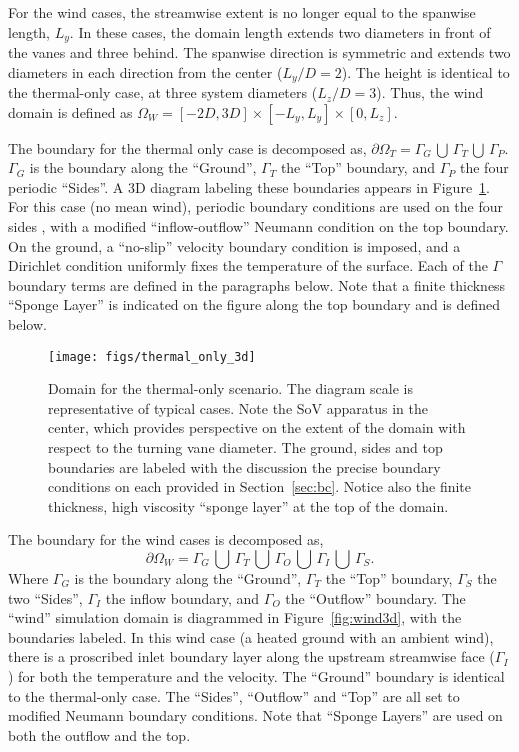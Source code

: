 For the wind cases, the streamwise extent is no longer equal to
the spanwise length, $L_y$. In these cases, the domain length extends
two diameters in front of the vanes and three behind. The
spanwise direction is symmetric and extends two diameters in each direction 
from the center ($L_y/D = 2$). The height is identical to the
thermal-only case, at three system diameters ($L_z/D = 3$). Thus, the
wind domain is defined as $\Omega_W = \left[-2D,3D \right] \times
\left[-L_y,L_y \right] \times \left[0,L_z \right]$.   

The boundary for the thermal only case is decomposed as,
$\partial \Omega_T = \Gamma_G \, \bigcup \, \Gamma_T \, \bigcup \,
\Gamma_P $.  
$\Gamma_G$ is the boundary along the ``Ground'', $\Gamma_T$
the ``Top'' boundary, and $\Gamma_P$ the four periodic ``Sides''. A 3D
diagram labeling these boundaries appears in
Figure~\ref{fig:thermal3d}. For this case (no mean wind),
periodic boundary conditions are used on the four sides , with a modified 
``inflow-outflow'' Neumann condition\cite{gunzburger1989finite} on the
top boundary. On the ground, a ``no-slip'' velocity boundary condition is
imposed, and a Dirichlet condition uniformly fixes
the temperature of the surface. 
Each of the $\Gamma$ boundary terms are defined in the paragraphs below. 
Note that a finite thickness ``Sponge Layer'' is
indicated on the figure along the top boundary and is defined below. 

\begin{figure}[!htb]
  \begin{center}
    \texttt{[image: figs/thermal\_only\_3d]}
    \caption{Domain for the thermal-only
   scenario. The diagram scale is representative of typical cases. Note
   the SoV apparatus in the center, which provides perspective on the
   extent of the domain with respect to the turning vane diameter. The
   ground, sides and top boundaries are labeled with the discussion the
   precise boundary conditions on each provided in
   Section~\ref{sec:bc}. Notice also the finite thickness, high
   viscosity ``sponge layer'' at the top of the domain.} 
    \label{fig:thermal3d}
  \end{center}
\end{figure}

The boundary for the wind cases is decomposed as,
\begin{equation*}
 \partial \Omega_W = \Gamma_G \, \bigcup \, \Gamma_T \, \bigcup \,
  \Gamma_O \, \bigcup \, \Gamma_I \, \bigcup \, \Gamma_S.  
  \end{equation*}
Where $\Gamma_G$ is the boundary along the ``Ground'',
$\Gamma_T$ the ``Top'' boundary, $\Gamma_S$ the two ``Sides'',
$\Gamma_I$ the inflow boundary, and $\Gamma_O$ the ``Outflow''  
boundary.
The ``wind'' simulation domain is diagrammed in
Figure~\ref{fig:wind3d}, with the boundaries labeled. 
In this wind case (a heated ground with 
an ambient wind), there is a proscribed inlet boundary layer
along the upstream streamwise face ($\Gamma_I$) for both the temperature
and the velocity. The ``Ground'' boundary is identical to
the thermal-only case. The ``Sides'', ``Outflow'' and ``Top'' are all
set to modified Neumann boundary conditions. Note that ``Sponge Layers''
are used on both the outflow and the top. 


